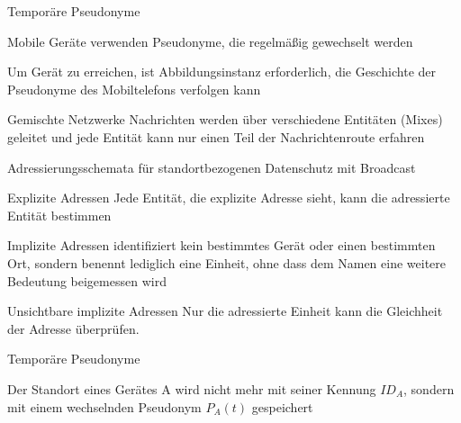 \documentclass[a4paper]{article}
\begin{document}
\begin{multicols}{3}
\begin{itemize*}
\begin{description*}
                  \item[Temporäre Pseudonyme]
                  \begin{itemize*}
                        \item Mobile Geräte verwenden Pseudonyme, die regelmäßig gewechselt werden
                        \item Um Gerät zu erreichen, ist Abbildungsinstanz erforderlich, die Geschichte der Pseudonyme des Mobiltelefons verfolgen kann
                  \end{itemize*}
                  \item[Gemischte Netzwerke] Nachrichten werden über verschiedene Entitäten (Mixes) geleitet und jede Entität kann nur einen Teil der Nachrichtenroute erfahren
            \end{description*}
            \item Adressierungsschemata für standortbezogenen Datenschutz mit Broadcast
            \begin{description*}
                  \item[Explizite Adressen] Jede Entität, die explizite Adresse sieht, kann die adressierte Entität bestimmen
                  \item[Implizite Adressen] identifiziert kein bestimmtes Gerät oder einen bestimmten Ort, sondern benennt lediglich eine Einheit, ohne dass dem Namen eine weitere Bedeutung beigemessen wird
                  \item{Unsichtbare implizite Adressen} Nur die adressierte Einheit kann die Gleichheit der Adresse überprüfen.
            \end{description*}
            \item Temporäre Pseudonyme
            \begin{itemize*}
                  \item Der Standort eines Gerätes A wird nicht mehr mit seiner Kennung $ID_A$, sondern mit einem wechselnden Pseudonym $P_A(t)$ gespeichert

\end{itemize*}
\end{itemize*}
\end{multicols}
\end{document}
